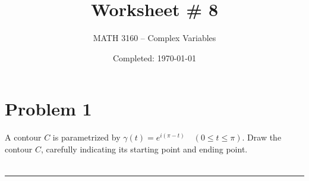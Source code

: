 \documentclass{article}
\title{Worksheet \# 8}
\author{
  MATH 3160 -- Complex Variables\\
  \myauthor
}
\date{Completed: \today}
\begin{document}
\maketitle %


\section*{Problem 1}
A contour $C$ is parametrized by $\gamma(t) = e^{i(\pi - t)} \quad (0 \leq t \leq \pi)$. Draw the contour $C$, carefully indicating its starting point and ending point. 

\begin{align*}
\end{align*}

\vspace{1cm} %
\begin{center}
\end{center}
\vspace{1cm}
\hrule %

\newpage
\end{document}
